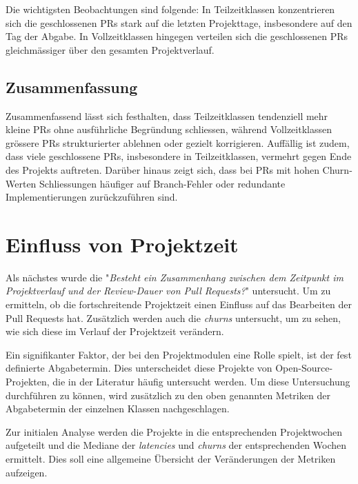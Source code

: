 Die wichtigsten Beobachtungen sind folgende: In Teilzeitklassen konzentrieren sich die geschlossenen PRs stark auf die letzten Projekttage, insbesondere auf den Tag der Abgabe. In Vollzeitklassen hingegen verteilen sich die geschlossenen PRs gleichmässiger über den gesamten Projektverlauf.


\subsection{Zusammenfassung}

Zusammenfassend lässt sich festhalten, dass Teilzeitklassen tendenziell mehr kleine PRs ohne ausführliche Begründung schliessen, während Vollzeitklassen grössere PRs strukturierter ablehnen oder gezielt korrigieren. Auffällig ist zudem, dass viele geschlossene PRs, insbesondere in Teilzeitklassen, vermehrt gegen Ende des Projekts auftreten. Darüber hinaus zeigt sich, dass bei PRs mit hohen Churn-Werten Schliessungen häufiger auf Branch-Fehler oder redundante Implementierungen zurückzuführen sind.

\section{Einfluss von Projektzeit}
Als nächstes wurde die  "\textit{Besteht ein Zusammenhang zwischen dem Zeitpunkt im Projektverlauf und der Review-Dauer von Pull Requests?}" untersucht. Um zu ermitteln, ob die fortschreitende Projektzeit einen Einfluss auf das Bearbeiten der Pull Requests hat. Zusätzlich werden auch die \textit{churns} untersucht, um zu sehen, wie sich diese im Verlauf der Projektzeit verändern. 


Ein signifikanter Faktor, der bei den Projektmodulen eine Rolle spielt, ist der fest definierte Abgabetermin. Dies unterscheidet diese Projekte von Open-Source-Projekten, die in der Literatur häufig untersucht werden. Um diese Untersuchung durchführen zu können, wird zusätzlich zu den oben genannten Metriken der Abgabetermin der einzelnen Klassen nachgeschlagen.

Zur initialen Analyse werden die Projekte in die entsprechenden Projektwochen aufgeteilt und die Mediane der \textit{latencies} und \textit{churns} der entsprechenden Wochen ermittelt. Dies soll eine allgemeine Übersicht der Veränderungen der Metriken aufzeigen.

